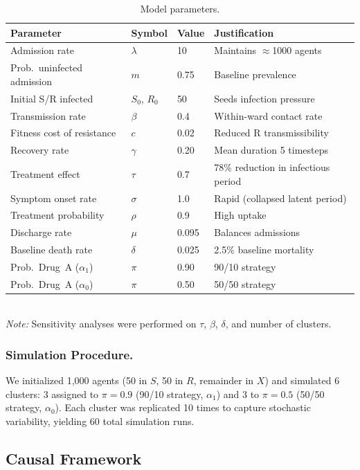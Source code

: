 \documentclass[12pt]{article}
\begin{document}
\begin{table}[htbp]
\centering
\caption{Model parameters.}
\label{tab:parameters}
{\small
\begin{tabular}{llll}
\toprule
\textbf{Parameter} & \textbf{Symbol} & \textbf{Value} & \textbf{Justification} \\
\midrule
Admission rate & $\lambda$ & 10 & Maintains $\approx$1000 agents \\
Prob.\ uninfected admission & $m$ & 0.75 & Baseline prevalence \\
Initial S/R infected & $S_0$, $R_0$ & 50 & Seeds infection pressure \\
Transmission rate & $\beta$ & 0.4 & Within-ward contact rate \\
Fitness cost of resistance & $c$ & 0.02 & Reduced R transmissibility \\
Recovery rate & $\gamma$ & 0.20 & Mean duration 5 timesteps \\
Treatment effect & $\tau$ & 0.7 & 78\% reduction in infectious period \\
Symptom onset rate & $\sigma$ & 1.0 & Rapid (collapsed latent period) \\
Treatment probability & $\rho$ & 0.9 & High uptake \\
Discharge rate & $\mu$ & 0.095 & Balances admissions \\
Baseline death rate & $\delta$ & 0.025 & 2.5\% baseline mortality \\
Prob.\ Drug~A ($\alpha_1$) & $\pi$ & 0.90 & 90/10 strategy \\
Prob.\ Drug~A ($\alpha_0$) & $\pi$ & 0.50 & 50/50 strategy \\
\bottomrule
\end{tabular}
}
\\[0.3em]
\footnotesize
\textit{Note:} Sensitivity analyses were performed on $\tau$, $\beta$, $\delta$, and number of clusters.
\end{table}

\subsubsection*{Simulation Procedure.}
We initialized 1,000 agents (50 in $S$, 50 in $R$, remainder in $X$) and simulated 6 clusters: 3 assigned to $\pi = 0.9$ (90/10 strategy, $\alpha_1$) and 3 to $\pi = 0.5$ (50/50 strategy, $\alpha_0$). Each cluster was replicated 10 times to capture stochastic variability, yielding 60 total simulation runs.

\subsection*{Causal Framework}
\end{document}
